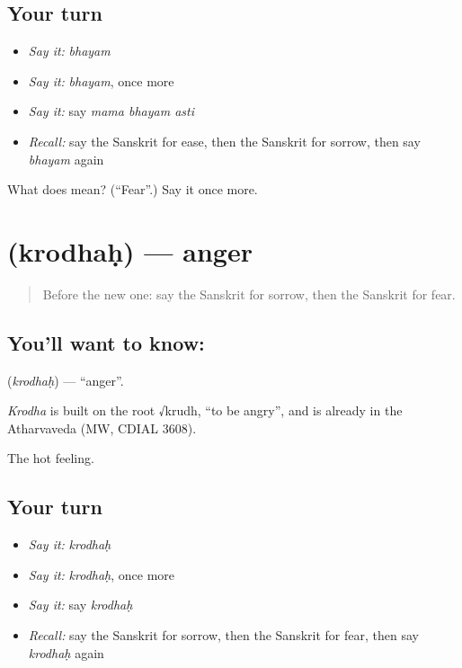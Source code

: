 \subsection*{Your turn}
\begin{itemize}
\raggedright
  \item \emph{Say it:} \emph{bhayam}
  \item \emph{Say it:} \emph{bhayam}, once more
  \item \emph{Say it:} say \emph{mama bhayam asti}
  \item \emph{Recall:} say the Sanskrit for ease, then the Sanskrit for sorrow, then say \emph{bhayam} again
\end{itemize}

\begin{tcolorbox}[breakable,colback=teal!4,colframe=teal!35!black,title={Before you move on}]
What does  mean? (\textquotedblleft{}Fear\textquotedblright{}.) Say it once more.
\end{tcolorbox}
\section[\texorpdfstring{\sk{क्रोधः} (krodhaḥ)}{क्रोधः (krodhaḥ)}]{ (krodhaḥ) — anger}

\label{lesson:SA-C68-anger}



\begin{quote}
Before the new one: say the Sanskrit for sorrow, then the Sanskrit for fear.
\end{quote}

\subsection*{You'll want to know: }
\textbf{} (\emph{krodhaḥ}) — \textquotedblleft{}anger\textquotedblright{}.

\begin{cousinweb}
\emph{Krodha} is built on the root √krudh, \textquotedblleft{}to be angry\textquotedblright{}, and is already in the Atharvaveda (MW, CDIAL 3608).
\end{cousinweb}

\begin{grammarlens}[title={What you've built}]
The hot feeling.
\end{grammarlens}

\subsection*{Your turn}
\begin{itemize}
\raggedright
  \item \emph{Say it:} \emph{krodhaḥ}
  \item \emph{Say it:} \emph{krodhaḥ}, once more
  \item \emph{Say it:} say \emph{krodhaḥ}
  \item \emph{Recall:} say the Sanskrit for sorrow, then the Sanskrit for fear, then say \emph{krodhaḥ} again
\end{itemize}

